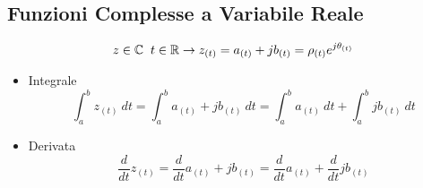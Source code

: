     \subsection{Funzioni Complesse a Variabile Reale}
        \[
           z \in \mathbb{C} \hspace{0.2cm} t \in \mathbb{R} \rightarrow z_{(t)} = a_{(t)} + jb_{(t)} = \rho_{(t)} e^{j\theta_{(t)}}
        \]
        \begin{itemize}
            \item {Integrale
            \[
                \int_{a}^{b} z_{(t)} \ dt = \int_{a}^{b} a_{(t)} + jb_{(t)} \ dt =\int_{a}^{b} a_{(t)} \ dt+\int_{a}^{b} jb_{(t)} \ dt  
            \]

            }
            \item {Derivata
            \[
                \frac{d}{dt} z_{(t)}= \frac{d}{dt} a_{(t)} + jb_{(t)} =\frac{d}{dt} a_{(t)} +\frac{d}{dt} jb_{(t)}   
            \]

            }
        \end{itemize}

